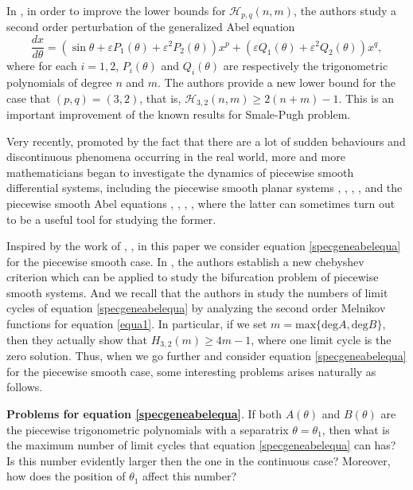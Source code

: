 \documentclass[11pt]{amsart}
\theoremstyle{remark}
\theoremstyle{definition}
\begin{document}
In \cite{HTC2020}, in order to improve the lower bounds for $\mathcal H_{p,q}(n,m)$, the authors study a second order perturbation of the generalized Abel equation
\begin{equation}\label{equa1}
\frac{dx}{d\theta}=(\sin \theta+\varepsilon P_1(\theta)+\varepsilon^2 P_2(\theta))x^{p}+(\varepsilon Q_1(\theta)+\varepsilon^2 Q_2(\theta))x^{q},
\end{equation}
where for each $i=1,2$, $P_i(\theta)$ and $Q_i(\theta)$ are respectively the trigonometric polynomials of degree $n$ and $m$. The authors provide a new lower bound for the case that $(p,q)=(3,2)$, that is,  $\mathcal H_{3,2}(n,m)\geq 2(n+m)-1$.
This  is an important improvement of the  known results for  Smale-Pugh problem.

Very recently, promoted by the fact that there are a lot of  sudden behaviours and discontinuous phenomena occurring in the real world,   more and more  mathematicians  began to
investigate the dynamics  of piecewise smooth differential systems, including the piecewise smooth planar systems  \cite{BBCK2008}, \cite{EP2023}, \cite{LL2023},  \cite{LV2023}, \cite{WZ2016} and the piecewise smooth   Abel equations \cite{HL2022},
\cite{HP2020}, \cite{HLZ2023},  \cite{ZhYuW2022}, where the latter
can   sometimes turn out to be a  useful tool for studying the  former.




Inspired by the work of \cite{HLZ2023}, \cite{HTC2020},  in this paper  we consider equation \eqref{specgeneabelequa} for the piecewise smooth  case.
In \cite{HLZ2023},  the authors establish a new chebyshev criterion which can be applied to study  the bifurcation problem of piecewise smooth systems. And we recall that  the authors in  \cite{HTC2020}  study  the numbers of limit cycles of  equation \eqref{specgeneabelequa}  by analyzing  the  second order Melnikov functions for equation    \eqref{equa1}.  In particular,  if we set $m=\mbox{max}\{\mbox{deg}A, \mbox{deg}B\}$, then  they actually  show that
   $H_{3,2}(m)\geq 4m-1$, where one limit cycle is the zero solution.
 Thus, when we go further and consider equation \eqref{specgeneabelequa} for  the  piecewise smooth case,  some interesting    problems    arises naturally as follows.

  {\bf Problems for equation   \eqref{specgeneabelequa}}. If both $A(\theta)$ and $B(\theta)$ are  the piecewise trigonometric polynomials with a separatrix $\theta=\theta_1$,  then what is the maximum number of limit cycles that  equation \eqref{specgeneabelequa} can has?
Is this number evidently larger then the one in the continuous case?  Moreover, how does the position of $\theta_1$ affect this number?
\end{document}
